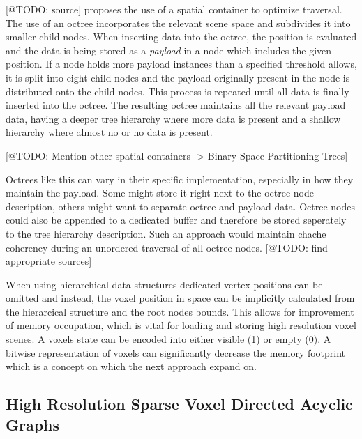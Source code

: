 [@TODO: source] proposes the use of a spatial container to optimize traversal. The use of an octree 
incorporates the relevant scene space and subdivides it into smaller child nodes. When inserting data 
into the octree, the position is evaluated and the data is being stored as a \emph{payload} in 
a node which includes the given position. If a node holds more payload instances than a specified threshold 
allows, it is split into eight child nodes and the payload originally present in the node is 
distributed onto the child nodes. This process is repeated until all data is finally inserted 
into the octree. The resulting octree maintains all the relevant payload data, having a deeper tree 
hierarchy where more data is present and a shallow hierarchy where almost no or no data is present.

[@TODO: Mention other spatial containers -> Binary Space Partitioning Trees]

Octrees like this can vary in their specific implementation, especially in how they maintain the 
payload. Some might store it right next to the octree node description, others might want to separate 
octree and payload data. Octree nodes could also be appended to a dedicated buffer and therefore be stored 
seperately to the tree hierarchy description. Such an approach would maintain chache coherency during an 
unordered traversal of all octree nodes. [@TODO: find appropriate sources]

When using hierarchical data structures dedicated vertex positions can be omitted and instead, 
the voxel position in space can be implicitly calculated from the hierarcical structure and the 
root nodes bounds. This allows for improvement of memory occupation, which is vital for loading and 
storing high resolution voxel scenes. A voxels state can be encoded into either visible (1) or empty (0).
A bitwise representation of voxels can significantly decrease the memory footprint which is a concept 
on which the next approach expand on.

\subsection{High Resolution Sparse Voxel Directed Acyclic Graphs} \label{subsec-highres-svo-dags}

